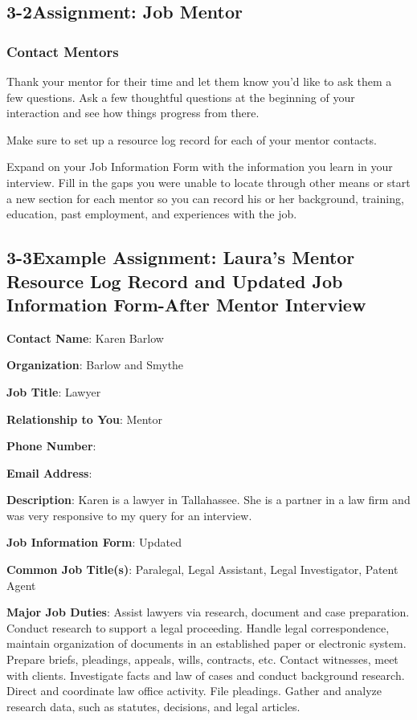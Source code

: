 \pagebreak \subsection*{3-2\quad  Assignment: Job Mentor}
\subsubsection*{Contact Mentors}
Thank your mentor for their time and let them know you'd like to ask them a few questions. Ask a few thoughtful questions at the beginning of your interaction and see how things progress from there.

Make sure to set up a resource log record for each of your mentor contacts.

Expand on your Job Information Form with the information you learn in your interview. Fill in the gaps you were unable to locate through other means or start a new section for each mentor so you can record his or her background, training, education, past employment, and experiences with the job.
\pagebreak \subsection*{3-3\quad  Example Assignment: Laura’s Mentor Resource Log Record and Updated Job Information Form-After Mentor Interview}

\textbf{Contact Name}: Karen Barlow 

\textbf{Organization}: Barlow and Smythe 

\textbf{Job Title}: Lawyer

\textbf{Relationship to You}: Mentor 

\textbf{Phone Number}:

\textbf{Email Address}:

\textbf{Description}: Karen is a lawyer in Tallahassee. She is a partner in a law firm and was very responsive to my query for an interview.

\textbf{Job Information Form}: Updated

\textbf{Common Job Title(s)}: Paralegal, Legal Assistant, Legal Investigator, Patent Agent

\textbf{Major Job Duties}: Assist lawyers via research, document and case preparation. Conduct research to support a legal proceeding. Handle legal correspondence, maintain organization of documents in an established paper or electronic system. Prepare briefs, pleadings, appeals, wills, contracts, etc. Contact witnesses, meet with clients. Investigate facts and law of cases and conduct background research. Direct and coordinate law office activity. File pleadings. Gather and analyze research data, such as statutes, decisions, and legal articles.

